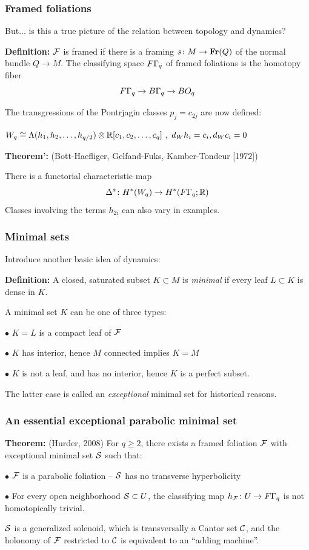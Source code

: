 \documentclass{beamer}
\begin{document}
\frame
{
  \frametitle{Framed foliations}

But... is this a true picture of the relation between topology and dynamics?


  \bigskip
  \pause
 {\bf Definition:} ${\mathcal F}$   is framed if there is a framing $s \colon M \to {\bf Fr}(Q)$ of the normal bundle $Q \to M$. 
The classifying space $F\Gamma_q$ of framed foliations is the homotopy fiber
$$F\Gamma_q \to B\Gamma_q \to BO_q$$

    \pause
The    transgressions of the Pontrjagin classes $p_j = c_{2j}$ are now defined:
\begin{center}
 $W_q \cong \Lambda(h_1, h_2, \ldots, h_{q/2}) \otimes {\mathbb R}[c_1, c_2, \ldots , c_q] ~, ~ d_W h_i = c_i , d_W c_i = 0$
 \end{center}
 
 \medskip

  {\bf Theorem':} (Bott-Haefliger, Gelfand-Fuks, Kamber-Tondeur [1972]) 
  
  There is a   functorial  characteristic map 
$$\Delta^s \colon H^*(W_q) \to H^*(F\Gamma_q ; {\mathbb R})$$
 Classes involving the terms $h_{2i}$ can also vary in examples.
  \vfill
  
}
  
  
\frame
{
  \frametitle{Minimal sets}

 
Introduce another basic idea of dynamics:

\medskip

{\bf Definition:} A closed, saturated  subset $K \subset M$ is \emph{minimal} if every leaf $L \subset K$ is dense in $K$. 

 \bigskip
  \pause

A minimal set $K$ can be one of three types:

$\bullet$ $K = L$ is a compact leaf of ${\mathcal F}$

$\bullet$ $K$ has interior, hence $M$ connected implies $K = M$

$\bullet$ $K$ is not a leaf, and has no interior, hence $K$ is a perfect subset.

\medskip

The latter case is called an \emph{exceptional} minimal set for historical reasons. 

  \vfill
  
}
  
 
\frame
{
  \frametitle{An essential exceptional parabolic minimal set}

 {\bf Theorem:} (Hurder, 2008) For $q \geq 2$, there exists a framed foliation ${\mathcal F}$   with exceptional minimal set ${\mathcal S}$ such that: 
 \medskip
 
 $\bullet$ ${\mathcal F}$ is a parabolic foliation -- ${\mathcal S}$ has no transverse hyperbolicity
 
 $\bullet$ For every open neighborhood ${\mathcal S} \subset U$, the classifying map $h_{{\mathcal F}} \colon U \to F\Gamma_q$ is not homotopically trivial.
 
 \bigskip
 \pause
 
  ${\mathcal S}$ is a generalized solenoid, which is transversally a Cantor set ${\mathcal C}$, and the holonomy of ${\mathcal F}$ restricted to ${\mathcal C}$ is equivalent to an ``adding machine''. 
 
 
  \vfill
  
}
  
\end{document}
